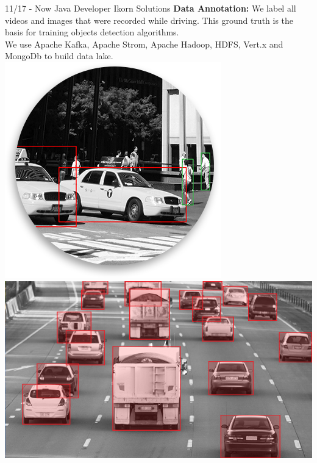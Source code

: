 \documentclass[]{friggeri-cv}
\begin{document}
\begin{entrylist}
\entry
    {11/17 - Now}
    {Java Developer}
    {Ikorn Solutions}
	{\textbf{ Data Annotation: } We label all videos and images that were recorded while driving. This ground truth is the basis for training objects detection algorithms.\\
	We use Apache Kafka, Apache Strom, Apache Hadoop, HDFS, Vert.x and MongoDb to build data lake.\\
		
	\includegraphics[scale=0.3]{img/labeling_img_14.png} \hspace{1cm}
	\includegraphics[scale=0.25]{img/labeling_img_5_1.png}\\
}
\end{entrylist}
\end{document}
